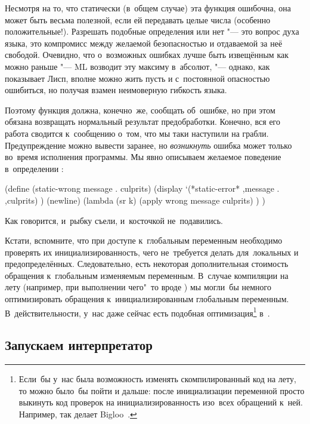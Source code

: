 Несмотря на то, что статически (в~общем случае) эта функция ошибочна, она может
быть весьма полезной, если ей передавать целые числа (особенно положительные!).
Разрешать подобные определения или нет "--- это вопрос духа языка, это
компромисс между желаемой безопасностью и отдаваемой за неё свободой. Очевидно,
что о~возможных ошибках лучше быть извещённым как можно раньше "--- ML возводит
эту максиму в~абсолют, "--- однако, как показывает Лисп, вполне можно жить пусть
и с~постоянной опасностью ошибиться, но получая взамен неимоверную гибкость
языка.

Поэтому функция  должна, конечно~же, сообщать об~ошибке, но при
этом обязана возвращать нормальный результат предобработки. Конечно, вся его
работа сводится к~сообщению о~том, что мы таки наступили на грабли.
Предупреждение можно вывести заранее, но \emph{возникнуть} ошибка может только
во~время исполнения программы. Мы явно описываем желаемое поведение
в~определении :

\begin{code:lisp}
(define (static-wrong message . culprits)
  (display `(*static-error*
             ,message . ,culprits) )
  (newline)
  (lambda (sr k)
    (apply wrong message culprits) ) )
\end{code:lisp}

\noindent
Как говорится, и~рыбку съели, и~косточкой не~подавились.

Кстати, вспомните, что при доступе к~глобальным переменным необходимо проверять
их инициализированность, чего не~требуется делать для~локальных и
предопределённых. Следовательно, есть некоторая дополнительная стоимость
обращения к~глобальным изменяемым переменным. В~случае компиляции на лету
(например, при выполнении чего"~то вроде ) мы могли~бы немного оптимизировать обращения к~инициализированным
глобальным переменным. В~действительности, у~нас даже сейчас есть подобная
оптимизация\footnote{Если~бы у~нас была возможность изменять скомпилированный
код на лету, то можно было~бы пойти и дальше: после инициализации переменной
просто выкинуть код проверок на инициализированность изо~всех обращений к~ней.
Например, так делает Bigloo~\cite{ser94}.} в~.


\subsection{Запускаем интерпретатор}\label{fast/fast/ssest:starting}

